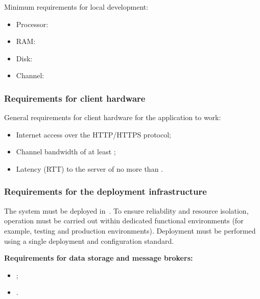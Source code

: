 \documentclass[12pt,a4paper]{extarticle}
\begin{document}
Minimum requirements for local development:

\begin{itemize}[leftmargin=1.25cm]
\item Processor: 
\item RAM: 
\item Disk: 
\item Channel: 
\end{itemize}

\subsubsection{Requirements for client hardware}

General requirements for client hardware for the application to work:

\begin{itemize}[leftmargin=1.25cm]
\item Internet access over the HTTP/HTTPS protocol;
\item Channel bandwidth of at least ;
\item Latency (RTT) to the server of no more than .
\end{itemize}

\subsubsection{Requirements for the deployment infrastructure}
\label{sec:deployment_infra}

The system must be deployed in~. To ensure reliability and resource isolation, operation must be carried out within dedicated functional environments (for example, testing and production environments). Deployment must be performed using a single deployment and configuration standard.

\textbf{Requirements for data storage and message brokers:}

\begin{itemize}[leftmargin=1.25cm]
\item {};
\item {}.
\end{itemize}
\end{document}
